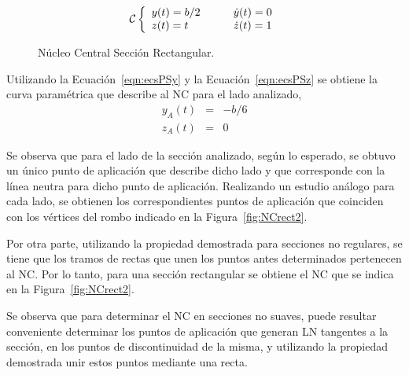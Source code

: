 \begin{equation}
\mcC %
\left\{
\begin{array}{l} y(t)=b/2 \\ z(t)=t \end{array}
\qquad
\begin{array}{l} \dot{y}(t)=0 \\ \dot{z}(t)=1 \end{array}
\right.
\end{equation}

\begin{figure}[htb]
	\centering
{}
\hspace{0.1\textwidth}
\caption{Núcleo Central Sección Rectangular.}
	\label{fig:NCrect}
\end{figure}

Utilizando la Ecuación~\eqref{eqn:ecsPSy} y la Ecuación~\eqref{eqn:ecsPSz} se obtiene la curva paramétrica que describe al NC para el lado analizado,
\begin{eqnarray}
y_A(t) &=& - b/6 \\
z_A(t) &=& 0
\end{eqnarray}

Se observa que para el lado de la sección analizado, según lo esperado, se obtuvo un único punto de aplicación que describe dicho lado y que corresponde con la línea neutra para dicho punto de aplicación. Realizando un estudio análogo para cada lado, se obtienen los correspondientes puntos de aplicación que coinciden con los vértices del rombo indicado en la Figura~\ref{fig:NCrect2}.

Por otra parte, utilizando la propiedad demostrada para secciones no regulares, se tiene que los tramos de rectas que unen los puntos antes determinados pertenecen al NC. Por lo tanto, para una sección rectangular se obtiene el NC que se indica en la Figura~\ref{fig:NCrect2}.

Se observa que para determinar el NC en secciones no suaves, puede resultar conveniente determinar los puntos de aplicación que generan LN tangentes a la sección, en los puntos de discontinuidad de la misma, y utilizando la propiedad demostrada unir estos puntos mediante una recta.


